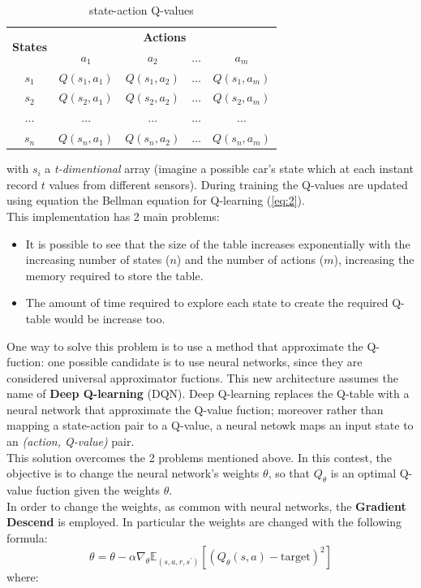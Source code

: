 \documentclass[14pt]{extarticle}
\def\pp{\vspace{10pt}\newline}
\def\ppn{\vspace{10pt}}
\begin{document}
\begin{flushleft}
\begin{table}[H]
\centering
\begin{tabular}{|c|c|c|c|c|}
\hline
\multirow{2}{*}{\textbf{States}} & \multicolumn{4}{c|}{\textbf{Actions}}                                \\ \cline{2-5} 
                                 & \textbf{$a_1$} & \textbf{$a_2$} & \textbf{$\dotso$} & \textbf{$a_m$} \\ \hline
$s_1$  				& $Q(s_1,a_1)$   				& $Q(s_1,a_2)$  				&  $\dotso$  				& $Q(s_1,a_m)$                \\ \hline
$s_2$  				& $Q(s_2,a_1)$   				& $Q(s_2,a_2)$  				&  $\dotso$  				& $Q(s_2,a_m)$                \\ \hline
$\dotso$      &  $\dotso$              	& $\dotso$              	&  $\dotso$              & $\dotso$              \\ \hline
$s_n$  				& $Q(s_n,a_1)$   				& $Q(s_n,a_2)$  				&  $\dotso$  				& $Q(s_n,a_m)$                \\ \hline
\end{tabular}
\caption{state-action Q-values}
\label{tab:my-table}
\end{table}
with $s_i$ a \emph{t-dimentional} array (imagine a possible car's state which at each instant record $t$ values from different sensors).
During training the Q-values are updated using equation the Bellman equation for Q-learning (\ref{eq:2}).
\\
This implementation has 2 main problems:
\begin{itemize}
\item It is possible to see that the size of the table increases exponentially with the increasing number of states ($n$) and the number of actions ($m$), increasing the memory required to store the table.
\item The amount of time required to explore each state to create the required Q-table would be increase too.
\end{itemize}

\ppn
One way to solve this problem is to use a method that approximate the Q-fuction: one possible candidate is to use neural networks, since they are considered universal approximator fuctions. This new architecture assumes the name of \textbf{Deep Q-learning} (DQN). Deep Q-learning replaces the Q-table with a neural network that approximate the Q-value fuction; moreover rather than mapping a state-action pair to a Q-value, a neural netowk maps an input state to an \emph{(action, Q-value)} pair.
\\
This solution overcomes the 2 problems mentioned above.
\pp
In this contest, the objective is to change the neural network's weights $\theta$, so that $Q_{\theta}$ is an optimal Q-value fuction given the weights $\theta$. \\
In order to change the weights, as common with neural networks, the \textbf{Gradient Descend} is employed. In particular the weights are changed with the following formula:
\[ \theta = \theta - \alpha\nabla_{\theta}\mathbb{E}_{(s,a,r,s^\prime)}[(Q_{\theta}(s,a) - \text{target})^2]\]
where:


\end{flushleft}
\end{document}
